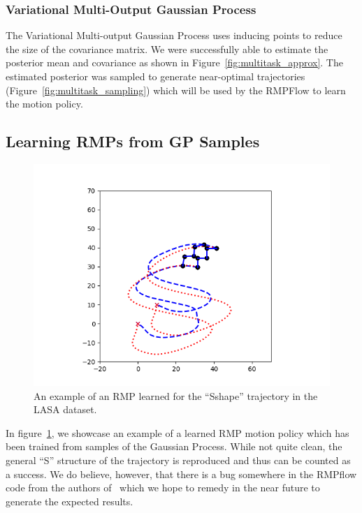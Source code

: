 \subsubsection{Variational Multi-Output Gaussian Process}
The Variational Multi-output Gaussian Process uses inducing points to reduce the size of the covariance matrix. We were successfully able to estimate the posterior mean and covariance as shown in Figure~\ref{fig:multitask_approx}. The estimated posterior was sampled to generate near-optimal trajectories (Figure~\ref{fig:multitask_sampling}) which will be used by the RMPFlow to learn the motion policy.

\subsection{Learning RMPs from GP Samples}

\begin{figure}[h!]
    \captionsetup{font=footnotesize}
    \centering
    \includegraphics[width=\columnwidth]{paper/images/gp_sample_rmpflow.png}
    \caption{An example of an RMP learned for the ``Sshape'' trajectory in the LASA dataset.}
    \label{fig:gp_rmpflow}
    \vspace{-2em}
\end{figure}

In figure~\ref{fig:gp_rmpflow}, we showcase an example of a learned RMP motion policy which has been trained from samples of the Gaussian Process.
While not quite clean, the general ``S'' structure of the trajectory is reproduced and thus can be counted as a success.
We do believe, however, that there is a bug somewhere in the RMPflow code from the authors of~\cite{Rana20ldc} which we hope to remedy in the near future to generate the expected results.
